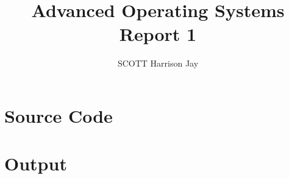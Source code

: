 \documentclass{article}
\title{Advanced Operating Systems Report 1}
\author{SCOTT Harrison Jay}
\begin{document}
\maketitle

\section{Source Code}


\clearpage

\section{Output}

\end{document}
